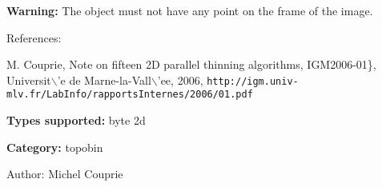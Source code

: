 {\bf Warning:} The object must not have any point on the frame of the image.

References:\par
 [COU05] M. Couprie, Note on fifteen 2D parallel thinning algorithms, IGM2006-01\}, Universit$\backslash$'e de Marne-la-Vall$\backslash$'ee, 2006, {\tt http://igm.univ-mlv.fr/LabInfo/rapportsInternes/2006/01.pdf}\par


{\bf Types supported:} byte 2d

{\bf Category:} topobin

\begin{Desc}
\item[Author:]Michel Couprie \end{Desc}
